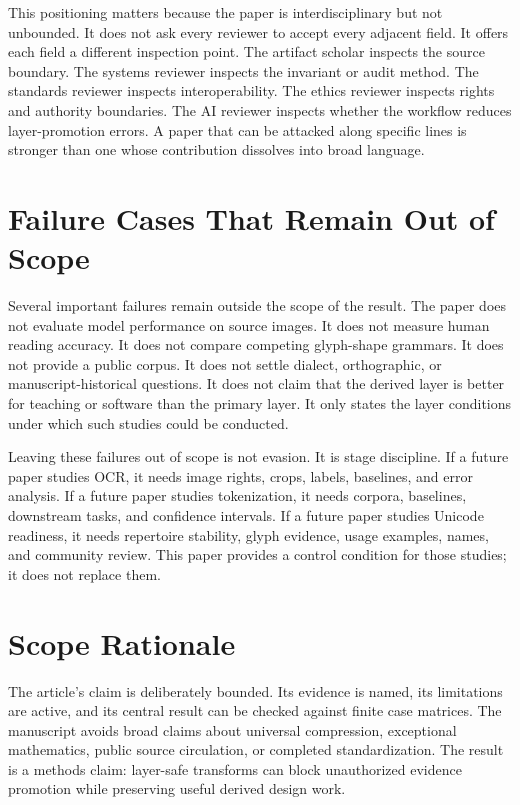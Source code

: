 \documentclass[sigconf,nonacm]{acmart}
\begin{document}
This positioning matters because the paper is interdisciplinary but not
unbounded. It does not ask every reviewer to accept every adjacent field. It
offers each field a different inspection point. The artifact scholar inspects
the source boundary. The systems reviewer inspects the invariant or audit
method. The standards reviewer inspects interoperability. The ethics reviewer
inspects rights and authority boundaries. The AI reviewer inspects whether the
workflow reduces layer-promotion errors. A paper that can be attacked along
specific lines is stronger than one whose contribution dissolves into broad
language.

\section{Failure Cases That Remain Out of Scope}
Several important failures remain outside the scope of the result. The paper does not
evaluate model performance on source images. It does not measure human reading
accuracy. It does not compare competing glyph-shape grammars. It does not
provide a public corpus. It does not settle dialect, orthographic, or
manuscript-historical questions. It does not claim that the derived layer is
better for teaching or software than the primary layer. It only states the layer
conditions under which such studies could be conducted.

Leaving these failures out of scope is not evasion. It is stage discipline. If a
future paper studies OCR, it needs image rights, crops, labels, baselines, and
error analysis. If a future paper studies tokenization, it needs corpora,
baselines, downstream tasks, and confidence intervals. If a future paper studies
Unicode readiness, it needs repertoire stability, glyph evidence, usage
examples, names, and community review. This paper provides a control condition
for those studies; it does not replace them.

\section{Scope Rationale}
The article's claim is deliberately bounded. Its evidence is named, its
limitations are active, and its central result can be checked against finite
case matrices. The manuscript avoids broad claims about universal compression,
exceptional mathematics, public source circulation, or completed
standardization. The result is a methods claim: layer-safe transforms can block
unauthorized evidence promotion while preserving useful derived design work.
\end{document}
